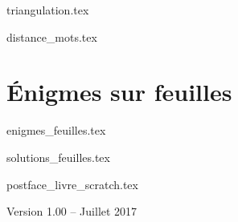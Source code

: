 \documentclass[11pt,twoside]{report}
\begin{document}
{triangulation.tex}

{distance_mots.tex}

\clearemptydoublepage
\setcounter{chapter}{0}

\part{Énigmes sur feuilles}

{enigmes_feuilles.tex}

{solutions_feuilles.tex}



{postface_livre_scratch.tex}

\vfill
\bigskip
\bigskip

\centerline{Version 1.00 -- Juillet 2017}
\end{document}
